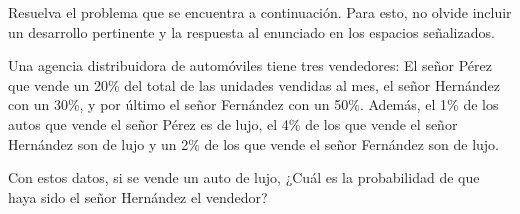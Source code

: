 \documentclass{cdplf-prueba}
\begin{document}
%
\begin{tcbraster}[enhanced,raster columns=3,raster width=\linewidth,raster column skip=3pt,raster force size=false]
    \begin{caja}[title={\sffamily\scshape\bfseries Nombre},height=30pt,add to width=4cm]
    \end{caja}
    \begin{caja}[title={\sffamily\scshape\bfseries Puntaje},height=30pt,add to width=-2cm]
    \end{caja}
    \begin{caja}[title={\sffamily\scshape\bfseries Nota},height=30pt,add to width=-2cm]
    \end{caja}                    
\end{tcbraster}
%
\vspace*{10pt}
\begin{tcolorbox}[boxrule=1pt,colback=white,leftrule=3mm]
    \raggedright Resuelva el problema que se encuentra a continuación. Para esto, no olvide 
    incluir un desarrollo pertinente y la respuesta al enunciado en los espacios señalizados.        
\end{tcolorbox}
%
Una agencia distribuidora de automóviles tiene tres vendedores: El señor Pérez 
que vende un 20\% del total de las unidades vendidas al mes, el señor Hernández 
con un 30\%, y por último el señor Fernández con un 50\%. Además, 
el 1\% de los autos que vende el señor Pérez es de lujo, el 4\% de los que vende 
el señor Hernández son de lujo y un 2\% de los que vende el señor Fernández son
de lujo.

Con estos datos, si se vende un auto de lujo, ¿Cuál es la probabilidad de que haya sido el señor 
Hernández el vendedor?
\begin{desarrollo}[height=10.5cm]
\end{desarrollo}
\begin{respuesta}[height=3cm]
\end{respuesta}
\end{document}
